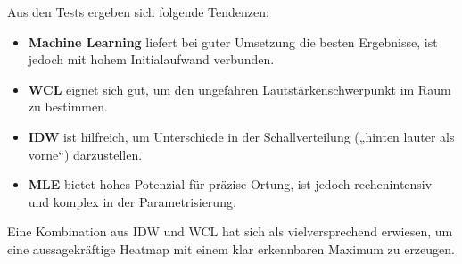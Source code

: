 Aus den Tests ergeben sich folgende Tendenzen:  
\begin{itemize}
    \item \textbf{Machine Learning} liefert bei guter Umsetzung die besten Ergebnisse, ist jedoch mit hohem Initialaufwand verbunden.
    \item \textbf{WCL} eignet sich gut, um den ungefähren Lautstärkenschwerpunkt im Raum zu bestimmen.
    \item \textbf{IDW} ist hilfreich, um Unterschiede in der Schallverteilung („hinten lauter als vorne“) darzustellen.
    \item \textbf{MLE} bietet hohes Potenzial für präzise Ortung, ist jedoch rechenintensiv und komplex in der Parametrisierung.
\end{itemize}

Eine Kombination aus IDW und WCL hat sich als vielversprechend erwiesen, um eine aussagekräftige Heatmap mit einem klar erkennbaren Maximum zu erzeugen.
